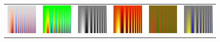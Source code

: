 \documentclass[review,journal]{vgtc}         %
\begin{document}
\begin{figure}
  \centering
  \begin{tabular}{c@{\;}c@{\;}c@{\;}c@{\;}c@{\;}c}
    \includegraphics[width=1.1in]{images/Cool2WarmSpatialContrast} &
    \includegraphics[width=1.1in]{images/RainbowSpatialContrast} &
    \includegraphics[width=1.1in]{images/GrayscaleSpatialContrast} &
    \includegraphics[width=1.1in]{images/BlackBodySpatialContrast} &
    \includegraphics[width=1.1in]{images/Green2RedSpatialContrast} &
    \includegraphics[width=1.1in]{images/Blue2YellowSpatialContrast} \\


\end{tabular}
\end{figure}
\end{document}
